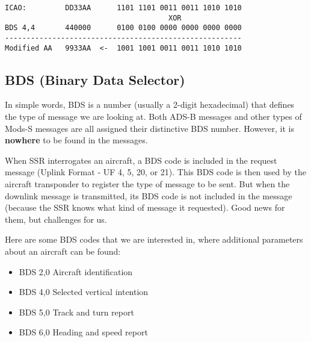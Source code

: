 \begin{verbatim}
ICAO:         DD33AA      1101 1101 0011 0011 1010 1010
                                      XOR
BDS 4,4       440000      0100 0100 0000 0000 0000 0000
-------------------------------------------------------
Modified AA   9933AA  <-  1001 1001 0011 0011 1010 1010
\end{verbatim}


\subsection{BDS (Binary Data Selector)}\label{bds-comm-b-data-selector}

In simple words, BDS is a number (usually a 2-digit hexadecimal) that
defines the type of message we are looking at. Both ADS-B messages and
other types of Mods-S messages are all assigned their distinctive BDS
number. However, it is \textbf{nowhere} to be found in the messages.

When SSR interrogates an aircraft, a BDS code is included in the request
message (Uplink Format - UF 4, 5, 20, or 21). This BDS code is then used
by the aircraft transponder to register the type of message to be sent.
But when the downlink message is transmitted, its BDS code is not
included in the message (because the SSR knows what kind of message it
requested). Good news for them, but challenges for us.

Here are some BDS codes that we are interested in, where additional
parameters about an aircraft can be found:

\begin{itemize}
  \item BDS 2,0   Aircraft identification
  \item BDS 4,0   Selected vertical intention
  \item BDS 5,0   Track and turn report
  \item BDS 6,0   Heading and speed report
\end{itemize}
